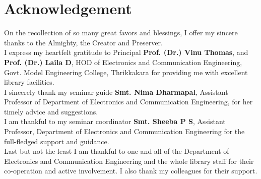 \documentclass[hidelinks, 12pt]{report}
\begin{document}
\pagebreak

\section*{Acknowledgement}
\justify
On the recollection of so many great favors and blessings, I offer my sincere thanks to the Almighty, the Creator and Preserver.\\

I express my heartfelt gratitude to Principal \textbf{Prof. (Dr.) Vinu Thomas}, and \textbf{Prof. (Dr.) Laila D}, HOD of Electronics and Communication Engineering, Govt. Model Engineering College, Thrikkakara for providing me with excellent library facilities. \\

I sincerely thank my seminar guide \textbf{Smt. Nima Dharmapal}, Assistant Professor of Department of Electronics and Communication Engineering, for her timely advice and suggestions.\\

I am thankful to my seminar coordinator \textbf{Smt. Sheeba P S}, Assistant Professor, Department of Electronics and Communication Engineering for the full-fledged support and guidance.  \\

Last but not the least I am thankful to one and all of the Department of Electronics and Communication Engineering and the whole library staff for their co-operation and active involvement.
I also thank my colleagues for their support.
\hbox{} \newpage 
{} 
\pagestyle{fancy}
\end{document}
